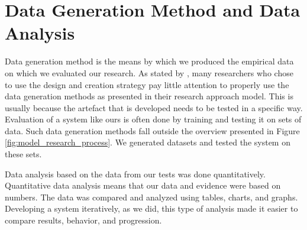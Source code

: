 \section{Data Generation Method and Data Analysis}
\label{sec:data_generation_methods_and_data_analysis}
Data generation method is the means by which we produced the empirical data on which we evaluated our research. As stated by \cite{oates2005researching}, many researchers who chose to use the design and creation strategy pay little attention to properly use the data generation methods as presented in their research approach model. This is usually because the artefact that is developed needs to be tested in a specific way. Evaluation of a system like ours is often done by training and testing it on sets of data. Such data generation methods fall outside the overview presented in Figure \ref{fig:model_research_process}. We generated datasets and tested the system on these sets.

Data analysis based on the data from our tests was done quantitatively. Quantitative data analysis means that our data and evidence were based on numbers. The data was compared and analyzed using tables, charts, and graphs. Developing a system iteratively, as we did, this type of analysis made it easier to compare results, behavior, and progression.